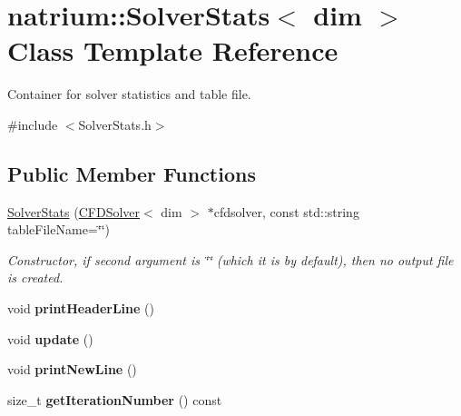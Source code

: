 \hypertarget{classnatrium_1_1SolverStats}{\section{natrium\-:\-:Solver\-Stats$<$ dim $>$ Class Template Reference}
\label{classnatrium_1_1SolverStats}
}


Container for solver statistics and table file.  




{\ttfamily \#include $<$Solver\-Stats.\-h$>$}

\subsection*{Public Member Functions}
\begin{DoxyCompactItemize}
\item 
\hypertarget{classnatrium_1_1SolverStats_aaa0b74781be83337875982f0a46c67b8}{\hyperlink{classnatrium_1_1SolverStats_aaa0b74781be83337875982f0a46c67b8}{Solver\-Stats} (\hyperlink{classnatrium_1_1CFDSolver}{C\-F\-D\-Solver}$<$ dim $>$ $\ast$cfdsolver, const std\-::string table\-File\-Name=\char`\"{}\char`\"{})}\label{classnatrium_1_1SolverStats_aaa0b74781be83337875982f0a46c67b8}

\begin{DoxyCompactList}\small\item\em Constructor, if second argument is \char`\"{}\char`\"{} (which it is by default), then no output file is created. \end{DoxyCompactList}\item 
\hypertarget{classnatrium_1_1SolverStats_a32c66bc8d05fbd0144dc9023fd17d3a8}{void {\bfseries print\-Header\-Line} ()}\label{classnatrium_1_1SolverStats_a32c66bc8d05fbd0144dc9023fd17d3a8}

\item 
\hypertarget{classnatrium_1_1SolverStats_a15b90f4fa22d7881a0ab868f2e12680b}{void {\bfseries update} ()}\label{classnatrium_1_1SolverStats_a15b90f4fa22d7881a0ab868f2e12680b}

\item 
\hypertarget{classnatrium_1_1SolverStats_a55101045c882c45fe3b46aa236d63604}{void {\bfseries print\-New\-Line} ()}\label{classnatrium_1_1SolverStats_a55101045c882c45fe3b46aa236d63604}

\item 
\hypertarget{classnatrium_1_1SolverStats_acf824edde9e155f0c19c591179fed5eb}{size\-\_\-t {\bfseries get\-Iteration\-Number} () const }\label{classnatrium_1_1SolverStats_acf824edde9e155f0c19c591179fed5eb}


\end{DoxyCompactItemize}
